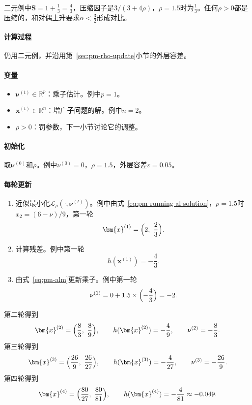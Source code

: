 二元例中$\bm{S}=1+\tfrac13=\tfrac43$，压缩因子是$3/(3+4\rho)$，$\rho=1.5$时为$\tfrac13$。任何$\rho>0$都是压缩的，和对偶上升要求$\alpha<\tfrac32$形成对比。

\paragraph{计算过程}
仍用二元例，并沿用第~\ref{sec:pm-rho-update}小节的外层容差。

\paragraph{变量}
\begin{itemize}
 \item $\bm{\nu}^{(t)}\in\mathbb{R}^p$：乘子估计。例中$p=1$。
 \item $\bm{x}^{(t)}\in\mathbb{R}^n$：增广子问题的解。例中$n=2$。
 \item $\rho>0$：罚参数，下一小节讨论它的调整。
\end{itemize}

\paragraph{初始化}
取$\bm{\nu}^{(0)}$和$\rho$。例中$\nu^{(0)}=0$，$\rho=1.5$，外层容差$\varepsilon=0.05$。

\paragraph{每轮更新}
\begin{enumerate}
 \item 近似最小化$\mathcal{L}_\rho(\cdot,\bm{\nu}^{(t)})$。例中由式~\eqref{eq:pm-running-al-solution}，$\rho=1.5$时$x_2=(6-\nu)/9$，第一轮
 \[
  \bm{x}^{(1)}=\Bigl(2,\ \frac23\Bigr).
 \]
 \item 计算残差。例中第一轮
 \[
  h(\bm{x}^{(1)})=-\frac43 .
 \]
 \item 由式~\eqref{eq:pm-alm}更新乘子。例中第一轮
 \[
  \nu^{(1)}=0+1.5\times\Bigl(-\frac43\Bigr)=-2 .
 \]
\end{enumerate}
第二轮得到
\[
 \bm{x}^{(2)}=\Bigl(\frac83,\ \frac89\Bigr),\qquad h(\bm{x}^{(2)})=-\frac49,\qquad \nu^{(2)}=-\frac83 .
\]
第三轮得到
\[
 \bm{x}^{(3)}=\Bigl(\frac{26}{9},\ \frac{26}{27}\Bigr),\qquad h(\bm{x}^{(3)})=-\frac{4}{27},\qquad \nu^{(3)}=-\frac{26}{9}.
\]
第四轮得到
\[
 \bm{x}^{(4)}=\Bigl(\frac{80}{27},\ \frac{80}{81}\Bigr),\qquad h(\bm{x}^{(4)})=-\frac{4}{81}\approx-0.049 .
\]

